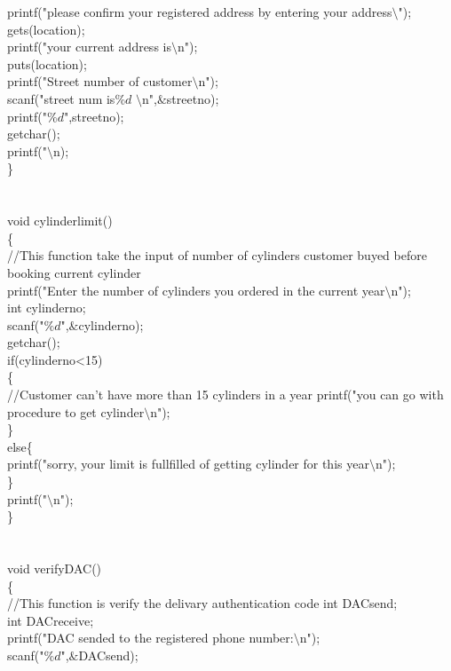 \documentclass{article}
\begin{document}
{	printf("please confirm your registered address by entering your address$\setminus$");\\
	gets(location);\\
	printf("your current address is$\setminus$n");\\
	puts(location);\\
	printf("Street number of customer$\setminus$n");\\
	scanf("street num is$\%d$ $\setminus$n",$\&$streetno);\\
	printf("$\%d$",streetno);\\	
	getchar();\\
	printf("$\setminus$n);\\
\}\\
\\
\\
void cylinderlimit()\\
\{\\
	//This function take the input of number of cylinders customer buyed before booking current cylinder\\
	printf("Enter the number of cylinders you ordered in the current year$\setminus$n");\\
	int cylinderno;\\
	scanf("$\%d$",$\&$cylinderno);\\
	getchar();\\
	if(cylinderno<15)\\
	\{\\
		//Customer can't have more than 15 cylinders in a year
		printf("you can go with procedure to get cylinder$\setminus$n");\\
	\}\\
	else\{\\
		printf("sorry, your limit is fullfilled of getting cylinder for this year$\setminus$n");\\
	\}\\
	printf("$\setminus$n");\\
\}\\
\\
\\
 void verifyDAC()\\
 \{\\
 	//This function is verify the delivary authentication code
 int DACsend;\\
 int DACreceive;\\
 printf("DAC sended to the registered phone number:$\setminus$n");\\
 scanf("$\%d$",$\&$DACsend);\\
}
\end{document}
